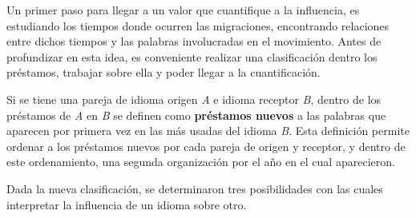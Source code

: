 

Un primer paso para llegar a un valor que cuantifique a la influencia, es
estudiando los tiempos donde ocurren las migraciones, encontrando relaciones
entre dichos tiempos y las palabras involucradas en el movimiento. Antes de
profundizar en esta idea, es conveniente realizar una clasificación dentro los
préstamos, trabajar sobre ella y poder llegar a la cuantificación. 

Si se tiene una pareja de idioma origen \textit{A} e idioma receptor
\textit{B},  dentro de los préstamos de \textit{A} en \textit{B} se definen
como  \textbf{préstamos nuevos} a las  palabras que aparecen por primera vez en
las más usadas del idioma \textit{B}. Esta definición permite ordenar a los
préstamos nuevos por cada pareja de origen y receptor, y dentro  de este
ordenamiento, una segunda organización  por el año en el cual aparecieron. 



Dada la nueva clasificación, se determinaron tres posibilidades con las cuales
interpretar la influencia de un idioma sobre otro. 

